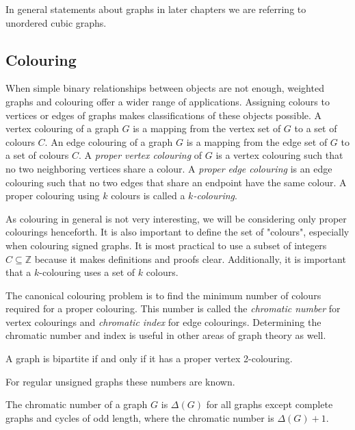 In general statements about graphs in later chapters we are referring to unordered cubic graphs.

\subsection{Colouring}

When simple binary relationships between objects are not enough, weighted graphs and colouring offer a wider range of applications. Assigning colours to vertices or edges of graphs makes classifications of these objects possible.
A vertex colouring of a graph $G$ is a mapping from the vertex set of $G$ to a set of colours $C$. An edge colouring of a graph $G$ is a mapping from the edge set of $G$ to a set of colours $C$.
A \textit{proper vertex colouring} of $G$ is a vertex colouring such that no two neighboring vertices share a colour. A \textit{proper edge colouring} is an edge colouring such that no two edges that share an endpoint have the same colour. A proper colouring using $k$ colours is called a \textit{$k$-colouring}.

As colouring in general is not very interesting, we will be considering only proper colourings henceforth. It is also important to define the set of "colours", especially when colouring signed graphs. It is most practical to use a subset of integers $C \subseteq \mathbb{Z}$ because it makes definitions and proofs clear. Additionally, it is important that a $k$-colouring uses a set of $k$ colours.

The canonical colouring problem is to find the minimum number of colours required for a proper colouring. This number is called the \textit{chromatic number} for vertex colourings and \textit{chromatic index} for edge colourings. Determining the chromatic number and index is useful in other areas of graph theory as well.

\begin{theorem}\label{th:bipartite}
    A graph is bipartite if and only if it has a proper vertex 2-colouring.
\end{theorem}

For regular unsigned graphs these numbers are known.

\begin{theorem}
    The chromatic number of a graph $G$ is $\Delta(G)$ for all graphs except complete graphs and cycles of odd length, where the chromatic number is $\Delta(G) + 1$.
\end{theorem}

